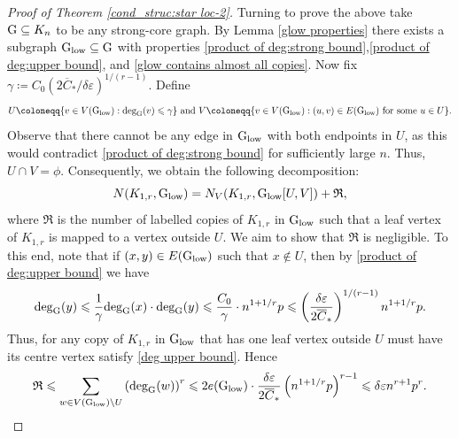 \documentclass[a4paper,11pt,english,reqno]{amsart}
\numberwithin{equation}{section}
\renewcommand{\leq}{\leqslant}
\newcommand{\cstar}{\overline{C}_{*}}
\newcommand{\glow}{\textup{G}_{\textup{low}}}
\newcommand{\tu}[1]{\textup{#1}}
\begin{document}
\begin{proof}[Proof of Theorem \ref{cond_struc:star loc-2}]
		Turning to prove the above take $\tu{G}\subseteq K_{n}$ to be any strong-core graph. By Lemma \ref{glow properties} there exists a subgraph $\glow\subseteq \tu{G}$ with properties \eqref{product of deg:strong bound},\eqref{product of deg:upper bound}, and \eqref{glow contains almost all copies}.
		Now fix $\gamma\coloneqq C_{0} \left(2\cstar/\delta\varepsilon\right)^{1/(r-1)}$.  Define 
		\[
		U\coloneqq \{v\in V(\glow): \tu{deg}_{\tu{G}}(v)\leq \gamma \} \text{ and } V\coloneqq\{v\in V(\glow): (u,v)\in E(\glow)\tu{ for some }u\in U \}. 
		\]
		Observe that there cannot be any edge in $\glow$ with both endpoints in $U$, as this would contradict \eqref{product of deg:strong bound} for sufficiently large $n$.  Thus, $U\cap V = \phi$. Consequently, we obtain the following decomposition:
		\begin{equation}
			\label{glow_split}
			N(K_{1,r}, \glow) = N_{V}(K_{1,r}, \glow[U,V]) + \mathfrak{R},
		\end{equation}  
		where $\mathfrak{R}$ is the number of labelled copies of $K_{1,r}$ in $\glow$ such that a leaf vertex of $K_{1,r}$ is mapped to a vertex outside $U$. We aim to show that $\mathfrak{R}$ is negligible.
		To this end, note that if $(x,y)\in E(\glow)$ such that $x\notin U$, then by \eqref{product of deg:upper bound} we have
		\begin{equation}
			\label{deg upper bound}
			\tu{deg}_{\tu{G}}(y)\leq \frac{1}{\gamma}\tu{deg}_{\tu{G}}(x)\cdot\tu{deg}_{\tu{G}}(y) \leq\frac{C_{0}}{\gamma} \cdot n^{1+1/r}p\leq \left(\frac{\delta \varepsilon}{2\cstar}\right)^{1/(r-1)} n^{1+1/r}p.
		\end{equation} 
		Thus, for any copy of $K_{1,r}$ in $\glow$ that has one leaf vertex outside $U$ must have its centre vertex satisfy \eqref{deg upper bound}. Hence %
		\begin{equation}
			\label{stars with one leaf outside U}
			\mathfrak{R}\leq \sum_{w\in V(\glow)\setminus U} \left(\tu{deg}_{\tu{G}}(w)\right)^{r}\leq 2e(\glow)\cdot \frac{\delta\varepsilon}{2\cstar}\left(n^{1+1/r}p\right)^{r-1}\leq \delta \varepsilon n^{r+1}p^{r}. 

\end{equation}
\end{proof}
\end{document}
